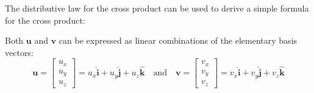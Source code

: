 \documentclass{article}
\begin{document}
The distributive law for the cross product can be used to derive a simple formula for the cross product:

Both \(\mathbf{u}\) and \(\mathbf{v}\) can be expressed as linear combinations of the elementary basis vectors:
\[\mathbf{u} = \begin{bmatrix} u_x \\ u_y \\ u_z \end{bmatrix} = u_x \hat{\mathbf{i}} + u_y \hat{\mathbf{j}} + u_z \hat{\mathbf{k}} \quad\text{and}\quad \mathbf{v} = \begin{bmatrix} v_x \\ v_y \\ v_z \end{bmatrix} = v_x \hat{\mathbf{i}} + v_y \hat{\mathbf{j}} + v_z \hat{\mathbf{k}}\]
\end{document}
